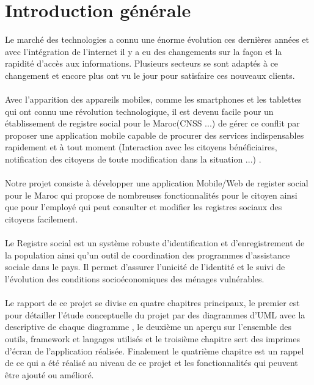 \chapter{Introduction générale}
{\large


Le marché des technologies a connu une énorme évolution ces dernières années et avec
l'intégration de l'internet il y a eu des changements sur la façon et la rapidité d’accès aux
informations. Plusieurs secteurs se sont adaptés à ce changement et encore plus ont vu le
jour pour satisfaire ces nouveaux clients. \\\\
Avec l’apparition des appareils mobiles, comme les smartphones et les tablettes qui ont
connu une révolution technologique, il est devenu facile pour un établissement de registre social pour le Maroc(CNSS ...) de gérer ce
conflit par proposer une application mobile capable de procurer des services
indispensables rapidement et à tout moment (Interaction avec les citoyens bénéficiaires, notification des citoyens de toute modification dans la situation ...)
.\\ \\Notre projet consiste à développer une application Mobile/Web de register social pour le Maroc  qui
propose de nombreuses fonctionnalités pour le citoyen ainsi que pour l'employé qui peut
consulter et modifier les registres sociaux
 des citoyens facilement.\\ \\
 Le Registre social est un système robuste d’identification et d’enregistrement de la population  ainsi qu’un outil de coordination des programmes d’assistance sociale dans le pays. Il permet d’assurer l’unicité de l’identité et le suivi de l’évolution des conditions socioéconomiques des ménages vulnérables.\\\\
Le rapport de ce projet se divise en  quatre chapitres principaux, le premier est pour détailler l'étude conceptuelle du projet par des  diagrammes d'UML avec  la descriptive de chaque diagramme
, le deuxième un aperçu sur l'ensemble des outils, framework et langages utilisés
  et le troisième chapitre sert des imprimes d'écran de l'application réalisée. Finalement le quatrième chapitre est un rappel de ce qui a été réalisé au niveau de ce projet et les fonctionnalités qui peuvent être ajouté ou amélioré.\\

}
\newpage 
